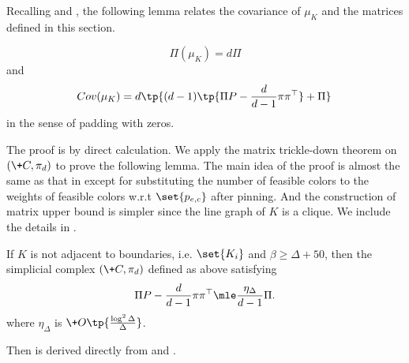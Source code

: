 Recalling  and , 
the following lemma relates the covariance of $\mu_K$ and the matrices defined in this section.
\begin{proposition}\label{lem:mtd-to-si}
    \[
    \Pi(\mu_K)=d\Pi
    \]
    and
    \[
    \!{Cov}(\mu_K) =d \tp{(d-1) \tp{\Pi P -\frac{d}{d-1}\pi \pi^\top} + \Pi}
    \]
    in the sense of padding with zeros.
\end{proposition}
The proof is by direct calculation.
We apply the matrix trickle-down theorem on $(\+C,\pi_d)$ to prove the following lemma. The main idea of the proof is almost the same as that in \cite{WZZ24} except for substituting the number of feasible colors to the weights of feasible colors w.r.t $\set{p_{e,c}}$ after pinning. And the construction of matrix upper bound is simpler since the line graph of $K$ is a clique. We include the details in .
\begin{lemma}\label{lem:PiP-bound}
    If $K$ is not adjacent to boundaries, i.e. $\set{K_i}$ and $\beta \geq \Delta + 50$, then the simplicial complex $(\+C,\pi_d)$ defined as above satisfying
    \[
    \Pi P -\frac{d}{d-1}\pi \pi^\top \mle \frac{\eta_{\Delta}}{d-1} \Pi.
    \]
    where $\eta_{\Delta}$ is $\+O\tp{\frac{\log^2 \Delta}{\Delta}}$.
\end{lemma}
Then  is derived directly from  and .
